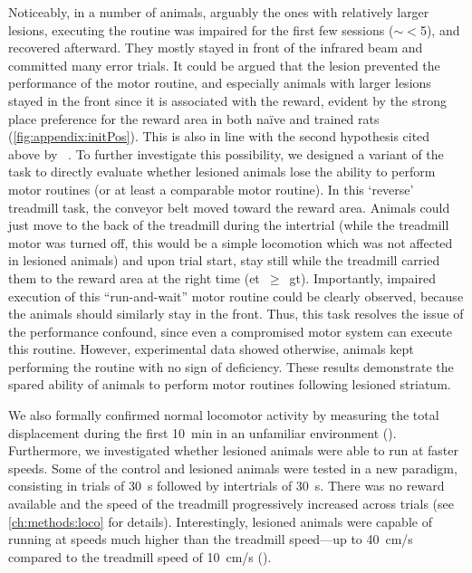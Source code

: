 \par
Noticeably, in a number of animals, arguably the ones with relatively larger lesions, executing the routine was impaired for the first few sessions ($\sim<$5), and recovered afterward.
They mostly stayed in front of the infrared beam and committed many error trials.
It could be argued that the lesion prevented the performance of the motor routine, and especially animals with larger lesions stayed in the front since it is associated with the reward, evident by the strong place preference for the reward area in both na\"{i}ve and trained rats (\autoref{fig:appendix:initPos}).
This is also in line with the second hypothesis cited above by \citeauthor{Dhawale2019}~\cite{Dhawale2019}.
To further investigate this possibility, we designed a variant of the task to directly evaluate whether lesioned animals lose the ability to perform motor routines (or at least a comparable motor routine).
In this `reverse' treadmill task, the conveyor belt moved toward the reward area.
Animals could just move to the back of the treadmill during the intertrial (while the treadmill motor was turned off, this would be a simple locomotion which was not affected in lesioned animals) and upon trial start, stay still while the treadmill carried them to the reward area at the right time (\gls{et}~$\geq$~\gls{gt}).
Importantly, impaired execution of this ``run-and-wait'' motor routine could be clearly observed, because the animals should similarly stay in the front.
Thus, this task resolves the issue of the performance confound, since even a compromised motor system can execute this routine.
However, experimental data showed otherwise, animals kept performing the routine with no sign of deficiency.
These results demonstrate the spared ability of animals to perform motor routines following lesioned striatum.
\par
We also formally confirmed normal locomotor activity by measuring the total displacement during the first 10~min in an unfamiliar environment ().
Furthermore, we investigated whether lesioned animals were able to run at faster speeds.
Some of the control and lesioned animals were tested in a new paradigm, consisting in trials of 30~s followed by intertrials of 30~s.
There was no reward available and the speed of the treadmill progressively increased across trials (see \autoref{ch:methods:loco} for details).
Interestingly, lesioned animals were capable of running at speeds much higher than the treadmill speed---up to 40~cm/s compared to the treadmill speed of 10~cm/s ().

